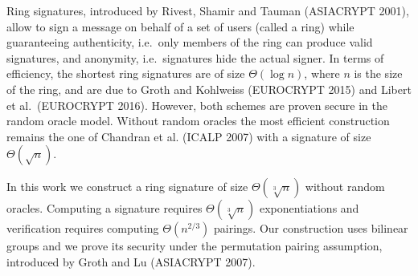 Ring signatures, introduced by Rivest, Shamir and Tauman (ASIACRYPT 2001), allow to sign a message on behalf of a set of users (called a ring) while guaranteeing authenticity, i.e.~only members of the ring can produce valid signatures, and anonymity, i.e.~signatures hide the actual signer. In terms of efficiency, the shortest ring signatures are of size $\Theta(\log n)$, where $n$ is the size of the ring, and are due to Groth and Kohlweiss (EUROCRYPT 2015) and Libert et al.~(EUROCRYPT 2016). However, both schemes are proven secure in the random oracle model. Without random oracles the most efficient construction remains the one of Chandran et al. (ICALP 2007) with a signature of size $\Theta(\sqrt{n})$.

In this work we construct a ring signature of size $\Theta(\sqrt[3]{n})$ without random oracles. Computing a signature requires $\Theta(\sqrt[3]{n})$ exponentiations and verification requires computing $\Theta(n^{2/3})$ pairings. Our construction uses bilinear groups and we prove its security under the permutation pairing assumption, introduced by Groth and Lu (ASIACRYPT 2007).
